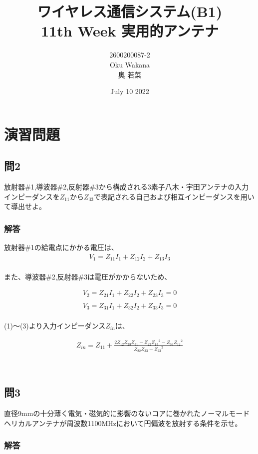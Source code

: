 \documentclass[dvipdfmx,autodetect-engine,titlepage]{jsarticle}
\title{ワイヤレス通信システム(B1)\\
11th Week 実用的アンテナ\\
}
\author{2600200087-2\\Oku Wakana\\奥 若菜}
\date{July 10 2022}
\begin{document}
\maketitle
\section*{演習問題}
\subsection*{問2}
放射器\#1,導波器\#2,反射器\#3から構成される3素子八木・宇田アンテナの入力インピーダンスを\begin{math}
  Z_{11}からZ_{33}
\end{math}で表記される自己および相互インピーダンスを用いて導出せよ。

\subsubsection*{解答}
放射器\#1の給電点にかかる電圧は、
\begin{eqnarray}
  V_1 = Z_{11}I_1 + Z_{12}I_2 + Z_{13}I_3
\end{eqnarray}
　\\
また、導波器\#2,反射器\#3は電圧がかからないため、

\begin{eqnarray}
  V_2 = Z_{21}I_1 + Z_{22}I_2 + Z_{23}I_3 = 0\\\nonumber\\
  V_3 = Z_{31}I_1 + Z_{32}I_2 + Z_{33}I_3 = 0
\end{eqnarray}
　\\
(1)〜(3)より入力インピーダンス\begin{math}
  Z_{in}
\end{math}は、

\begin{eqnarray*}
  Z_{in} = Z_{11} + \frac{2Z_{12}Z_{23}Z_{31} - Z_{22}{Z_{13}}^2 - Z_{33}{Z_{12}}^2}{Z_{22}Z_{33}-{Z_{23}}^2}
\end{eqnarray*}

　\\
\subsection*{問3}
直径9mmの十分薄く電気・磁気的に影響のないコアに巻かれたノーマルモードヘリカルアンテナが周波数1100MHzにおいて円偏波を放射する条件を示せ。

\subsubsection*{解答}
\end{document}
